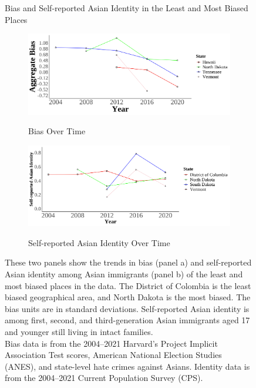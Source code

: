 \begin{center}
\begin{figure}[H]
\caption{Bias and Self-reported Asian Identity in the Least and Most Biased Places} \label{fig:toptwobias}

\begin{subfigure}{.9\textwidth}
\caption{Bias Over Time}
\centering
\includegraphics[width=.9\linewidth]{Bias_twostates.png} 
\label{fig:skiniat}
\end{subfigure}
\begin{subfigure}{.9\textwidth}
\caption{Self-reported Asian Identity Over Time}
\centering
\includegraphics[width=.9\linewidth]{Bias_twostates-asian.png} 
\label{fig:Asian-twostates}
\end{subfigure}
\caption*{\footnotesize{These two panels show the trends in bias (panel a) and self-reported Asian identity among Asian immigrants (panel b) of the least and most biased places in the data. The District of Colombia is the least biased geographical area, and North Dakota is the most biased. The bias units are in standard deviations. Self-reported Asian identity is among first, second, and third-generation Asian immigrants aged 17 and younger still living in intact families.\\
Bias data is from the 2004--2021 Harvard's Project Implicit Association Test scores, American National Election Studies (ANES), and state-level hate crimes against Asians. Identity data is from the 2004--2021 Current Population Survey (CPS).}}
\end{figure}
\end{center}



